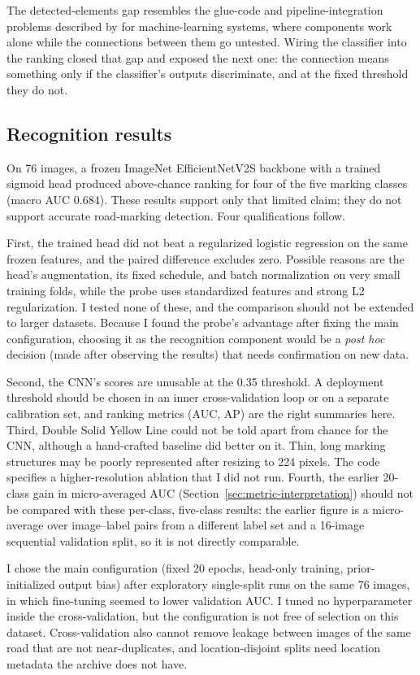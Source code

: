 \documentclass[11pt]{article}
\begin{document}
The detected-elements gap resembles the glue-code and pipeline-integration problems described by \citet{sculley2015} for machine-learning systems, where components work alone while the connections between them go untested. Wiring the classifier into the ranking closed that gap and exposed the next one: the connection means something only if the classifier's outputs discriminate, and at the fixed threshold they do not.

\subsection{Recognition results}
On 76 images, a frozen ImageNet EfficientNetV2S backbone with a trained sigmoid head produced above-chance ranking for four of the five marking classes (macro AUC 0.684). These results support only that limited claim; they do not support accurate road-marking detection. Four qualifications follow.

First, the trained head did not beat a regularized logistic regression on the same frozen features, and the paired difference excludes zero. Possible reasons are the head's augmentation, its fixed schedule, and batch normalization on very small training folds, while the probe uses standardized features and strong L2 regularization. I tested none of these, and the comparison should not be extended to larger datasets. Because I found the probe's advantage after fixing the main configuration, choosing it as the recognition component would be a \emph{post hoc} decision (made after observing the results) that needs confirmation on new data.

Second, the CNN's scores are unusable at the 0.35 threshold. A deployment threshold should be chosen in an inner cross-validation loop or on a separate calibration set, and ranking metrics (AUC, AP) are the right summaries here. Third, Double Solid Yellow Line could not be told apart from chance for the CNN, although a hand-crafted baseline did better on it. Thin, long marking structures may be poorly represented after resizing to 224 pixels. The code specifies a higher-resolution ablation that I did not run. Fourth, the earlier 20-class gain in micro-averaged AUC (Section~\ref{sec:metric-interpretation}) should not be compared with these per-class, five-class results: the earlier figure is a micro-average over image--label pairs from a different label set and a 16-image sequential validation split, so it is not directly comparable.

I chose the main configuration (fixed 20 epochs, head-only training, prior-initialized output bias) after exploratory single-split runs on the same 76 images, in which fine-tuning seemed to lower validation AUC. I tuned no hyperparameter inside the cross-validation, but the configuration is not free of selection on this dataset. Cross-validation also cannot remove leakage between images of the same road that are not near-duplicates, and location-disjoint splits need location metadata the archive does not have.
\end{document}

